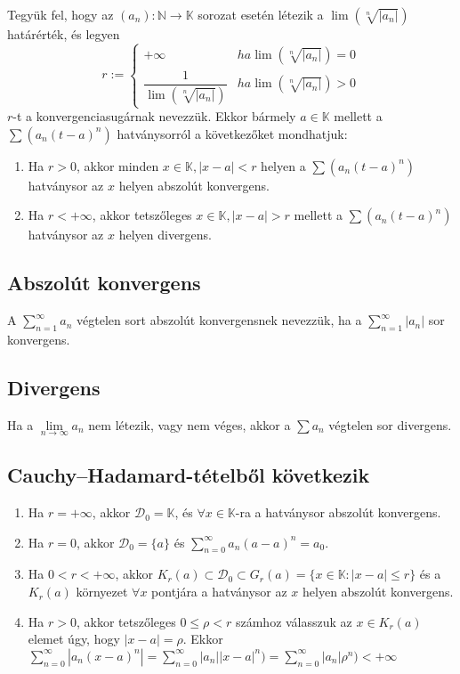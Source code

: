 \documentclass[margin=0px]{article}
\begin{document}
	Tegyük fel, hogy az $(a_{n}) : \mathbb{N} \to \mathbb{K}$ sorozat esetén létezik a $\lim{(\sqrt[n]{|a_{n}|})}$ határérték, és legyen
	$$ r := \left\{\begin{array} {lr}
			+\infty & ha \lim{(\sqrt[n]{|a_{n}|})} = 0 \\
			\dfrac{1}{\lim{(\sqrt[n]{|a_{n}|})}} & ha \lim{(\sqrt[n]{|a_{n}|})} > 0
	\end{array}\right.$$
	$r$-t a konvergenciasugárnak nevezzük.
	Ekkor bármely $a \in \mathbb{K}$ mellett a $\sum{(a_{n}(t-a)^{n})}$ hatványsorról a következőket mondhatjuk:
	\begin{enumerate}
		\item Ha $r > 0$, akkor minden $x \in \mathbb{K}, |x-a| < r$ helyen a $\sum{(a_{n}(t-a)^{n})}$ hatványsor az $x$ helyen abszolút konvergens.
		\item Ha $r < +\infty$, akkor tetszőleges $x \in \mathbb{K}, |x-a| > r$ mellett a $\sum{(a_{n}(t-a)^{n})}$ hatványsor az $x$ helyen divergens.
	\end{enumerate}
	
	\subsection{Abszolút konvergens}
	
	A $\sum\limits_{n=1}^{\infty}{a_{n}}$ végtelen sort abszolút konvergensnek nevezzük, ha a $\sum\limits_{n=1}^{\infty}{|a_{n}|}$ sor konvergens.
	
	\subsection{Divergens}
	
	Ha a $\lim\limits_{n \to \infty}{a_{n}}$ nem létezik, vagy nem véges, akkor a $\sum{a_{n}}$ végtelen sor divergens.
	
	\subsection{Cauchy--Hadamard-tételből következik}
	 
	\begin{enumerate}
		\item Ha $r = +\infty$, akkor $\mathcal{D}_{0} = \mathbb{K}$, és $\forall x \in \mathbb{K}$-ra a hatványsor abszolút konvergens.
		\item Ha $r = 0$, akkor $\mathcal{D}_{0} = \{a\}$ és $\sum\limits_{n=0}^{\infty}{a_{n}(a-a)^{n}} = a_{0}$.
		\item Ha $0 < r < +\infty$, akkor $K_{r}(a) \subset \mathcal{D}_{0} \subset G_{r}(a) = \{x \in \mathbb{K} : |x-a| \leq r\}$ és a $K_{r}(a)$ környezet $\forall x$ pontjára a hatványsor az $x$ helyen abszolút konvergens.
		\item Ha $r > 0$, akkor tetszőleges $0 \leq \rho < r$ számhoz válasszuk az $x \in K_{r}(a)$ elemet úgy, hogy $|x-a| = \rho$. Ekkor $\sum\limits_{n=0}^{\infty}{|a_{n}(x-a)^{n}|} = \sum\limits_{n=0}^{\infty}{|a_{n}||x-a|^{n})} = \sum\limits_{n=0}^{\infty}{|a_{n}|\rho^{n})} < +\infty$
	\end{enumerate}
\end{document}
